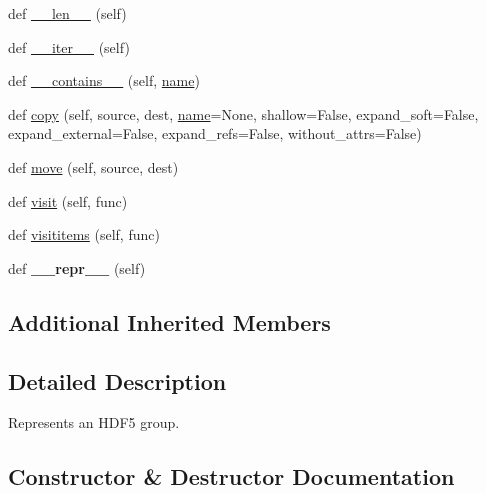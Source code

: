 \begin{DoxyCompactItemize}
\item 
def \hyperlink{classh5py__LOCAL_1_1__hl_1_1group_1_1Group_a35b45ddb20c477fec6fc78ed783ebb74}{\+\_\+\+\_\+len\+\_\+\+\_\+} (self)
\item 
def \hyperlink{classh5py__LOCAL_1_1__hl_1_1group_1_1Group_a531c2b1360a914ced4ffa8c250a36b14}{\+\_\+\+\_\+iter\+\_\+\+\_\+} (self)
\item 
def \hyperlink{classh5py__LOCAL_1_1__hl_1_1group_1_1Group_acc0299fe7d07b59a1da0193be3e9b009}{\+\_\+\+\_\+contains\+\_\+\+\_\+} (self, \hyperlink{classh5py__LOCAL_1_1__hl_1_1base_1_1HLObject_a75703ed103699785a900c90c5a0d5044}{name})
\item 
def \hyperlink{classh5py__LOCAL_1_1__hl_1_1group_1_1Group_a7185c006ccbb516d5b34e6510b97c19a}{copy} (self, source, dest, \hyperlink{classh5py__LOCAL_1_1__hl_1_1base_1_1HLObject_a75703ed103699785a900c90c5a0d5044}{name}=None, shallow=False, expand\+\_\+soft=False, expand\+\_\+external=False, expand\+\_\+refs=False, without\+\_\+attrs=False)
\item 
def \hyperlink{classh5py__LOCAL_1_1__hl_1_1group_1_1Group_a973210ac5339210ea1b4ef3c44f0388b}{move} (self, source, dest)
\item 
def \hyperlink{classh5py__LOCAL_1_1__hl_1_1group_1_1Group_a44fd1b9e065b9c7156bebd875c281f15}{visit} (self, func)
\item 
def \hyperlink{classh5py__LOCAL_1_1__hl_1_1group_1_1Group_a820a244df4042520aecaa0f853cc9d92}{visititems} (self, func)
\item 
\mbox{\label{classh5py__LOCAL_1_1__hl_1_1group_1_1Group_a70a70acdf92d04a0acf07d6dbabb5da2}} 
def {\bfseries \+\_\+\+\_\+repr\+\_\+\+\_\+} (self)
\end{DoxyCompactItemize}
\subsection*{Additional Inherited Members}


\subsection{Detailed Description}
\begin{DoxyVerb}Represents an HDF5 group.
\end{DoxyVerb}
 

\subsection{Constructor \& Destructor Documentation}
\mbox{\label{classh5py__LOCAL_1_1__hl_1_1group_1_1Group_a94e0a171d5c72220f94da45fd2954470}} 
